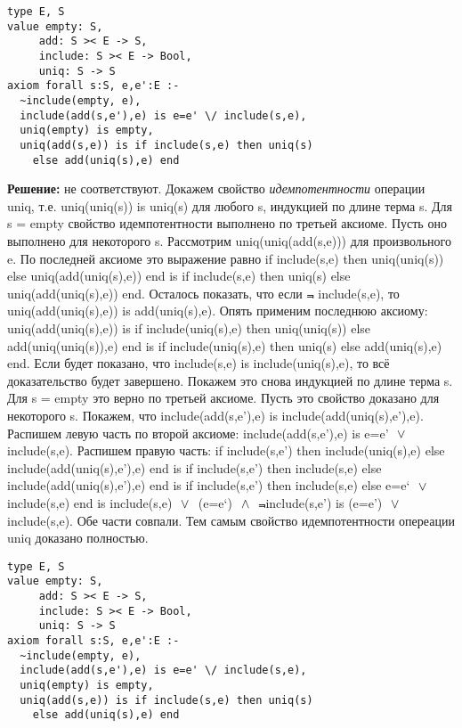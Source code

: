 \z \begin{lstlisting}
type E, S
value empty: S,
     add: S >< E -> S,
     include: S >< E -> Bool,
     uniq: S -> S
axiom forall s:S, e,e':E :-
  ~include(empty, e),
  include(add(s,e'),e) is e=e' \/ include(s,e),
  uniq(empty) is empty,
  uniq(add(s,e)) is if include(s,e) then uniq(s)
    else add(uniq(s),e) end
\end{lstlisting}

\MediumPicture{}

\textbf{Решение:} не соответствуют. Докажем свойство \emph{идемпотентности} операции uniq, т.е. uniq(uniq(s)) is uniq(s) для любого s, индукцией по длине терма s. Для s = empty свойство идемпотентности выполнено по третьей аксиоме. Пусть оно выполнено для некоторого s. Рассмотрим uniq(uniq(add(s,e))) для произвольного e. По последней аксиоме это выражение равно if include(s,e) then uniq(uniq(s)) else uniq(add(uniq(s),e)) end is if include(s,e) then uniq(s) else uniq(add(uniq(s),e)) end. Осталось показать, что если $\Not$ include(s,e), то uniq(add(uniq(s),e)) is add(uniq(s),e). Опять применим последнюю аксиому: uniq(add(uniq(s),e)) is if include(uniq(s),e) then uniq(uniq(s)) else add(uniq(uniq(s)),e) end is if include(uniq(s),e) then uniq(s) else add(uniq(s),e) end. Если будет показано, что include(s,e) is include(uniq(s),e), то всё доказательство будет завершено. Покажем это снова индукцией по длине терма s. Для s = empty это верно по третьей аксиоме. Пусть это свойство доказано для некоторого s. Покажем, что include(add(s,e'),e) is include(add(uniq(s),e'),e). Распишем левую часть по второй аксиоме: include(add(s,e'),e) is e=e' $~\vee~$ include(s,e). Распишем правую часть: if include(s,e') then include(uniq(s),e) else include(add(uniq(s),e'),e) end is if include(s,e') then include(s,e) else include(add(uniq(s),e'),e) end is if include(s,e') then include(s,e) else e=e` $~\vee~$ include(s,e) end is include(s,e) $~\vee~$ (e=e`) $~\wedge~$ $\Not$include(s,e') is (e=e') $~\vee~$ include(s,e). Обе части совпали. Тем самым свойство идемпотентности опереации uniq доказано полностью.

\z \begin{lstlisting}
type E, S
value empty: S,
     add: S >< E -> S,
     include: S >< E -> Bool,
     uniq: S -> S
axiom forall s:S, e,e':E :-
  ~include(empty, e),
  include(add(s,e'),e) is e=e' \/ include(s,e),
  uniq(empty) is empty,
  uniq(add(s,e)) is if include(s,e) then uniq(s)
    else add(uniq(s),e) end
\end{lstlisting}

